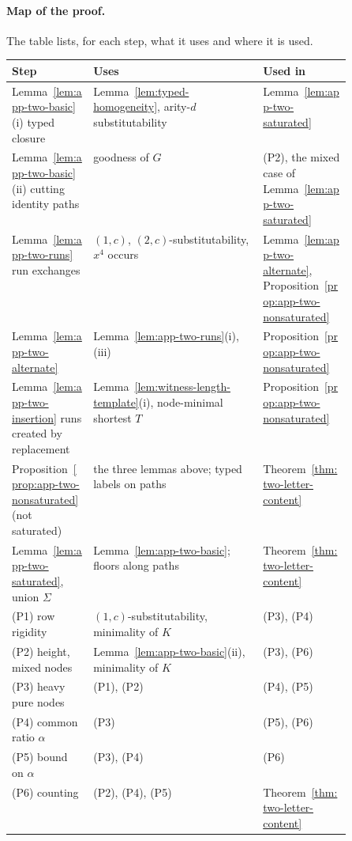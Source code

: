 \documentclass[11pt]{article}
\numberwithin{equation}{section}
\theoremstyle{plain}
\theoremstyle{definition}
\theoremstyle{remark}
\theoremstyle{plain}
\begin{document}
\paragraph{Map of the proof.}
The table lists, for each step, what it uses and where it is used.
\begin{center}
\footnotesize
\setlength{\tabcolsep}{3pt}
\renewcommand{\arraystretch}{1.15}
\begin{tabularx}{\linewidth}{@{}>{\raggedright\arraybackslash}p{0.24\linewidth}>{\raggedright\arraybackslash}X>{\raggedright\arraybackslash}p{0.26\linewidth}@{}}
\hline
Step & Uses & Used in\\
\hline
Lemma~\ref{lem:app-two-basic}(i) typed closure
 & Lemma~\ref{lem:typed-homogeneity}, arity-$d$ substitutability
 & Lemma~\ref{lem:app-two-saturated}\\
Lemma~\ref{lem:app-two-basic}(ii) cutting identity paths
 & goodness of $G$
 & (P2), the mixed case of Lemma~\ref{lem:app-two-saturated}\\
Lemma~\ref{lem:app-two-runs} run exchanges
 & $(1,c)$, $(2,c)$-substitutability, $x^4$ occurs
 & Lemma~\ref{lem:app-two-alternate}, Proposition~\ref{prop:app-two-nonsaturated}\\
Lemma~\ref{lem:app-two-alternate}
 & Lemma~\ref{lem:app-two-runs}(i),(iii)
 & Proposition~\ref{prop:app-two-nonsaturated}\\
Lemma~\ref{lem:app-two-insertion} runs created by replacement
 & Lemma~\ref{lem:witness-length-template}(i), node-minimal shortest $T$
 & Proposition~\ref{prop:app-two-nonsaturated}\\
Proposition~\ref{prop:app-two-nonsaturated} (not saturated)
 & the three lemmas above; typed labels on paths
 & Theorem~\ref{thm:two-letter-content}\\
Lemma~\ref{lem:app-two-saturated}, union $\Sigma$
 & Lemma~\ref{lem:app-two-basic}; floors along paths
 & Theorem~\ref{thm:two-letter-content}\\
(P1) row rigidity
 & $(1,c)$-substitutability, minimality of $K$
 & (P3), (P4)\\
(P2) height, mixed nodes
 & Lemma~\ref{lem:app-two-basic}(ii), minimality of $K$
 & (P3), (P6)\\
(P3) heavy pure nodes
 & (P1), (P2)
 & (P4), (P5)\\
(P4) common ratio $\alpha$
 & (P3)
 & (P5), (P6)\\
(P5) bound on $\alpha$
 & (P3), (P4)
 & (P6)\\
(P6) counting
 & (P2), (P4), (P5)
 & Theorem~\ref{thm:two-letter-content}\\
\hline
\end{tabularx}
\end{center}
\end{document}
